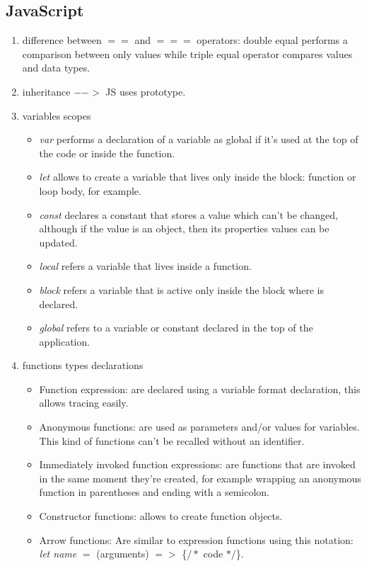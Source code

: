 \subsection{JavaScript}
\begin{multicols}{2}
\begin{enumerate}
\item difference between $==$ and $===$ operators: double equal performs a comparison between only values while triple equal operator compares values and data types.
\item inheritance $-->$ JS uses prototype.
\item variables scopes
\begin{itemize}
\item \emph{var} performs a declaration of a variable as global if it's used at the top of the code or inside the function.
\item \emph{let} allows to create a variable that lives only inside the block: function or loop body, for example.
\item \emph{const} declares a constant that stores a value which can't be changed, although if the value is an object, then its properties values can be updated.
\item \emph{local} refers a variable that lives inside a function.
\item \emph{block} refers a variable that is active only inside the block where is declared.
\item \emph{global} refers to a variable or constant declared in the top of the application.
\end{itemize}
\item functions types declarations
\begin{itemize}
\item Function expression: are declared using a variable format declaration, this allows tracing easily.
\item Anonymous functions: are used as parameters and/or values for variables. This kind of functions can't be recalled without an identifier.
\item Immediately invoked function expressions: are functions that are invoked in the same moment they're created, for example wrapping an anonymous function in parentheses and ending with a semicolon.
\item Constructor functions: allows to create function objects.
\item Arrow functions: Are similar to expression functions using this notation: \emph{let name} $=$ (arguments) $=>$ \{$/*$ code $*/$\}.

\end{itemize}
\end{enumerate}
\end{multicols}
